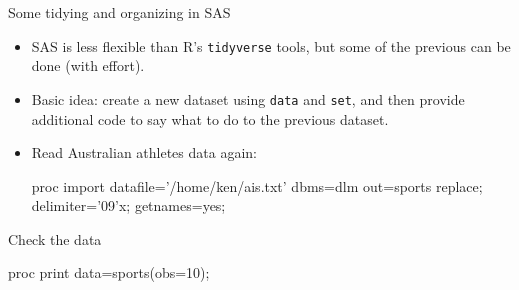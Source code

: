 \documentclass[unknownkeysallowed]{beamer}\usepackage[]{graphicx}\usepackage[]{color}
\begin{document}

\begin{frame}[fragile]{Some tidying and organizing in SAS}
  
  \begin{itemize}
  \item SAS is less flexible than R's \texttt{tidyverse} tools, but
    some of the previous can be done (with effort).
  \item Basic idea: create a new dataset using \texttt{data} and
    \texttt{set}, and then provide additional code to say what to do
    to the previous dataset.
  \item Read Australian athletes data again:
    
    \begin{Datastep}
proc import 
  datafile='/home/ken/ais.txt'
  dbms=dlm
  out=sports
  replace;
  delimiter='09'x;
  getnames=yes;

    \end{Datastep}
    
  \end{itemize}
  
\end{frame}

\begin{frame}[fragile]{Check the data}
  
  \begin{Sascode}[store=ta]
proc print data=sports(obs=10);    
  \end{Sascode}
  
  
\end{frame}
\end{document}
